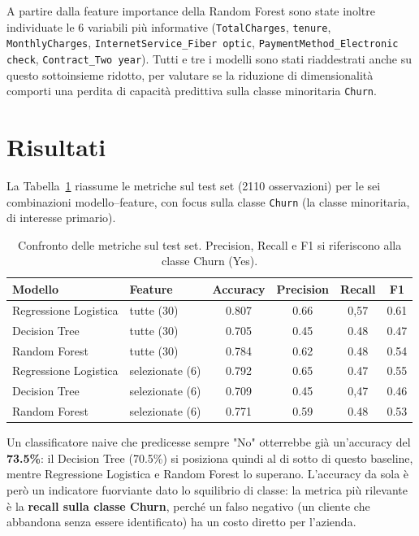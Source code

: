 \documentclass[11pt]{article}
\begin{document}
A partire dalla feature importance della Random Forest sono state inoltre
individuate le 6 variabili più informative (\texttt{TotalCharges},
\texttt{tenure}, \texttt{MonthlyCharges}, \texttt{InternetService\_Fiber
optic}, \texttt{PaymentMethod\_Electronic check}, \texttt{Contract\_Two year}). Tutti e tre i modelli sono stati riaddestrati anche su questo sottoinsieme ridotto, per valutare se la riduzione di dimensionalità comporti una perdita di capacità predittiva sulla classe minoritaria \texttt{Churn}.

\section{Risultati}
\label{sec:risultati}

La Tabella~\ref{tab:risultati} riassume le metriche sul test set (2110 osservazioni) per le sei combinazioni modello--feature, con focus sulla classe \texttt{Churn} (la classe minoritaria, di interesse primario).

\begin{table}[h]
\centering
\caption{Confronto delle metriche sul test set. Precision, Recall e F1 si riferiscono alla classe Churn (Yes).}
\label{tab:risultati}
\begin{tabular}{llcccc}
\hline
\textbf{Modello} & \textbf{Feature} & \textbf{Accuracy} & \textbf{Precision} & \textbf{Recall} & \textbf{F1} \\
\hline
Regressione Logistica & tutte (30)       & 0.807 & 0.66 & 0,57 & 0.61 \\
Decision Tree          & tutte (30)       & 0.705 & 0.45 & 0.48 & 0.47 \\
Random Forest          & tutte (30)       & 0.784 & 0.62 & 0.48 & 0.54 \\
\hline
Regressione Logistica & selezionate (6)  & 0.792 & 0.65 & 0.47 & 0.55 \\
Decision Tree          & selezionate (6)  & 0.709 & 0.45 & 0,47 & 0.46 \\
Random Forest          & selezionate (6)  & 0.771 & 0.59 & 0.48 & 0.53 \\
\hline
\end{tabular}
\end{table}

Un classificatore naive che predicesse sempre "No" otterrebbe già un'accuracy del \textbf{73.5\%}: il Decision Tree (70.5\%) si posiziona quindi al di sotto di questo baseline, mentre Regressione Logistica e Random Forest lo superano. L'accuracy da sola è però un indicatore fuorviante dato lo squilibrio di classe: la metrica più rilevante è la \textbf{recall sulla classe Churn}, perché un falso negativo (un cliente che abbandona senza essere identificato) ha un costo diretto per l'azienda.
\end{document}
